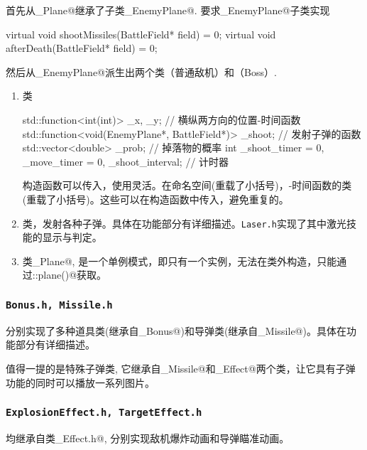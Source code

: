 \documentclass[UTF8,12pt]{ctexart}
\begin{document}
	            首先从\cppinline@_Plane@继承了子类\cppinline@_EnemyPlane@. 要求\cppinline@_EnemyPlane@子类实现
	            \begin{cppcode}
                    virtual void shootMissiles(BattleField* field) = 0;
                    virtual void afterDeath(BattleField* field) = 0;
                \end{cppcode}
	            然后从\cppinline@_EnemyPlane@派生出两个类\cppinline@EnemyPlane@（普通敌机）和\cppinline@BossPlane@（Boss）.
	            \begin{enumerate}[nosep,label={\arabic*°: }]
	                \item 类
	                    \begin{cppcode}
                            std::function<int(int)> _x, _y; // 横纵两方向的位置-时间函数
                            std::function<void(EnemyPlane*, BattleField*)> _shoot; // 发射子弹的函数
                            std::vector<double> _prob; // 掉落物的概率
                            int _shoot_timer = 0, _move_timer = 0, _shoot_interval; // 计时器
                        \end{cppcode}
	                    构造函数可以传入，使用灵活。在命名空间(重载了小括号)，-时间函数的类(重载了小括号)。这些可以在构造函数中传入，避免重复的。
	                \item 类，发射各种子弹。具体在功能部分有详细描述。\texttt{Laser.h}实现了其中激光技能的显示与判定。
	                \item 类\cppinline@_Plane@, 是一个单例模式，即只有一个实例，无法在类外构造，只能通过\cppinline@PlayerPlane::plane()@获取。
	            \end{enumerate}

	        \subsubsection{\tt Bonus.h, Missile.h}
	            分别实现了多种道具类(继承自\cppinline@_Bonus@)和导弹类(继承自\cppinline@_Missile@)。具体在功能部分有详细描述。

	            值得一提的是特殊子弹类\cppinline@SpecialMissile@, 它继承自\cppinline@_Missile@和\cppinline@_Effect@两个类，让它具有子弹功能的同时可以播放一系列图片。

	        \subsubsection{\tt ExplosionEffect.h, TargetEffect.h}
	            均继承自类\cppinline@_Effect.h@, 分别实现敌机爆炸动画和导弹瞄准动画。
\end{document}
